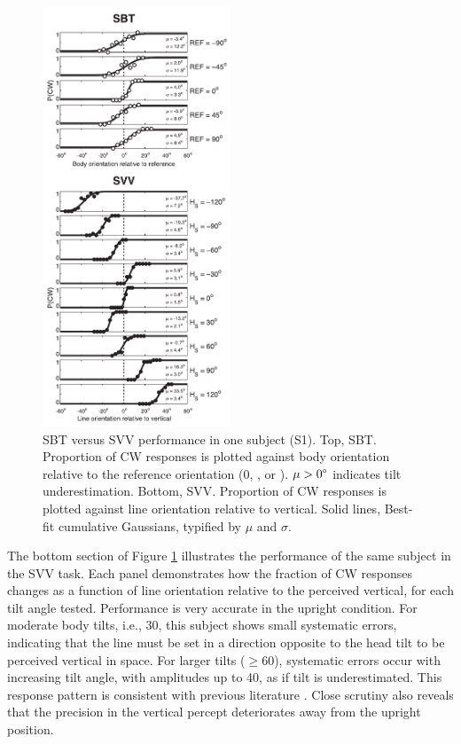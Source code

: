 \begin{figure}
    \includegraphics[width=0.5\textwidth]{src/paper1/figure3.pdf}
    
    \caption{SBT versus SVV performance in one subject (S1). Top, SBT. Proportion of CW responses is plotted against body orientation relative to the reference orientation (0\textdegree, \textdegree, or \textdegree). $\mu > 0\degree$ indicates tilt underestimation. Bottom, SVV. Proportion of CW responses is plotted against line orientation relative to vertical. Solid lines, Best-fit cumulative Gaussians, typified by $\mu$ and $\sigma$.}  
    \label{p1:fig3}
\end{figure}

The bottom section of Figure \ref{p1:fig3} illustrates the performance of the same subject in the SVV task. Each panel demonstrates how the fraction of CW responses changes as a function of line orientation relative to the perceived vertical, for each tilt angle tested. Performance is very accurate in the upright condition. For moderate body tilts, i.e., 30\textdegree, this subject shows small systematic errors, indicating that the line must be set in a direction opposite to the head tilt to be perceived vertical in space. For larger tilts ($\ge 60$), systematic errors occur with increasing tilt angle, with amplitudes up to 40\textdegree, as if tilt is underestimated. This response pattern is consistent with previous literature \cite{aubert1861, udodehaes1970, mittelstaedt1983, vanbeuzekom2000}. Close scrutiny also reveals that the precision in the vertical percept deteriorates away from the upright position. 

